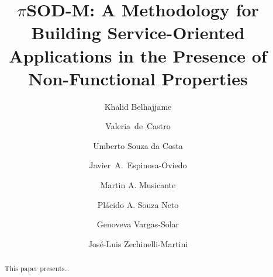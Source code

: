 \documentclass[preprint,12pt]{elsarticle}
\theoremstyle{plain}
\theoremstyle{plain}
\theoremstyle{plain}
\theoremstyle{plain}
\newcommand{\pisodm}[0]{$\pi$SOD-M\xspace}
\begin{document}
\begin{frontmatter}



\title{\pisodm: A Methodology for Building Service-Oriented Applications in
the Presence of Non-Functional Properties}



\author[inst1]{Khalid Belhajjame}
\author[inst2]{Valeria~de~Castro}
\author[inst3]{Umberto Souza da Costa}
\author[inst4]{Javier~A.~Espinosa-Oviedo}
\author[inst3]{Martin A. Musicante}
\author[inst5]{Pl\'acido A. Souza Neto}
\author[inst6,inst4]{Genoveva Vargas-Solar}
\author[inst4]{Jos\'e-Luis Zechinelli-Martini}


\address[inst1]{Universi\'e de Paris - Dauphine -- Paris, France}
\address[inst2]{Universidad Rey Juan Carlos -- M\'{o}stoles, Spain}
\address[inst3]{Federal University of Rio Grande do Norte -- Natal, Brazil}
\address[inst4]{Universidad de las Am\'ericas-Puebla, LAFMIA -- Cholula, Mexico}
\address[inst5]{Federal Technological Institute of Rio Grande do Norte -- Natal, Brazil}
\address[inst6]{CNRS, LIG-LAFMIA, Saint Martin d'H\`eres, France}


\begin{abstract}
This paper presents\ldots
\end{abstract}

\begin{keyword}


\end{keyword}

\end{frontmatter}
\end{document}
